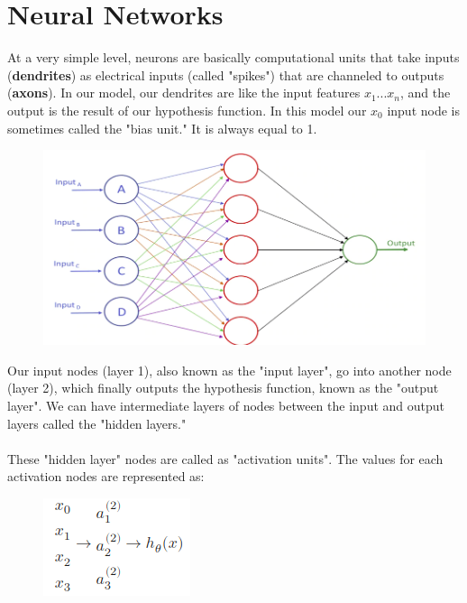\documentclass[12pt]{report}
\begin{document}
\chapter{Neural Networks}
  At a very simple level, neurons are basically computational units that take inputs (\textbf{dendrites}) as electrical inputs (called "spikes") that are channeled to outputs (\textbf{axons}). In our model, our dendrites are like the input features $x_1...x_n$, and the output is the result of our hypothesis function. In this model our $x_0$ input node is sometimes called the "bias unit." It is always equal to 1.

  \begin{figure}[h]
    \centering
    \includegraphics[scale=0.3]{neuralnetwork.png}
  \end{figure}

  Our input nodes (layer 1), also known as the "input layer", go into another node (layer 2), which finally outputs the hypothesis function, known as the "output layer". We can have intermediate layers of nodes between the input and output layers called the "hidden layers."
  \\\\
  These "hidden layer" nodes are called as "activation units". The values for each activation nodes are represented as: \\
  \begin{figure}[h]
    \centering
    \includegraphics[scale=0.6]{hiddenlayer.png}
  \end{figure}
\end{document}
